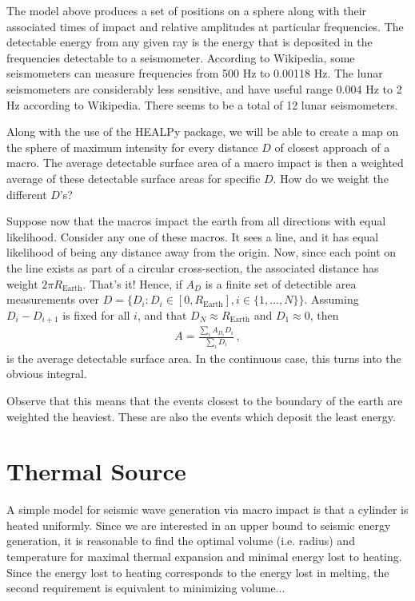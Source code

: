 \documentclass{article}
\newcommand*\te[1]{\text{#1}}
\newcommand*\f[2]{\frac{#1}{#2}}
\begin{document}
The model above produces a set of positions on a sphere along with their associated times of impact and relative amplitudes at particular frequencies. The detectable energy from any given ray is the energy that is deposited in the frequencies detectable to a seismometer. According to Wikipedia, some seismometers can measure frequencies from 500 Hz to 0.00118 Hz. The lunar seismometers are considerably less sensitive, and have useful range 0.004 Hz to 2 Hz according to Wikipedia. There seems to be a total of 12 lunar seismometers.

Along with the use of the HEALPy package, we will be able to create a map on the sphere of maximum intensity for every distance $D$ of closest approach of a macro. The average detectable surface area of a macro impact is then a weighted average of these detectable surface areas for specific $D$. How do we weight the different $D$'s?

Suppose now that the macros impact the earth from all directions with equal likelihood. Consider any one of these macros. It sees a line, and it has equal likelihood of being any distance away from the origin. Now, since each point on the line exists as part of a circular cross-section, the associated distance has weight $2\pi R_{\te{Earth}}$. That's it! Hence, if $A_D$ is a finite set of detectible area measurements over $D = \{D_i:D_i\in[0,R_\te{Earth}],i\in\{1,\dots,N\}\}$. Assuming $D_i - D_{i+1}$ is fixed for all $i$, and that $D_N\approx R_{\te{Earth}}$ and $D_1 \approx 0$, then 
\begin{align}
A=\f{\sum_i A_{D_i}D_i}{\sum_i D_i}\,,
\end{align}
is the average detectable surface area. In the continuous case, this turns into the obvious integral.

Observe that this means that the events closest to the boundary of the earth are weighted the heaviest. These are also the events which deposit the least energy.

\pagebreak
\section{Thermal Source}
A simple model for seismic wave generation via macro impact is that a cylinder is heated uniformly. Since we are interested in an upper bound to seismic energy generation, it is reasonable to find the optimal volume (i.e. radius) and temperature for maximal thermal expansion and minimal energy lost to heating. Since the energy lost to heating corresponds to the energy lost in melting, the second requirement is equivalent to minimizing volume... 
\pagebreak
\end{document}
